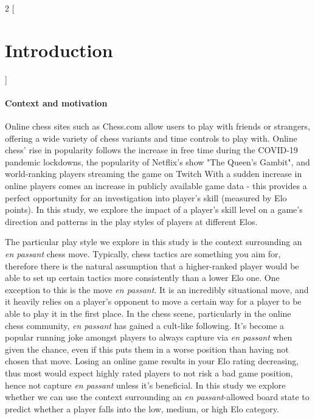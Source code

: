 \documentclass[10pt,a4paper]{article}
\begin{document}
\begin{multicols}{2}
[
\section{Introduction}
]

\paragraph{Context and motivation}

Online chess sites such as Chess.com allow users to play with friends or strangers, offering a wide variety of chess variants and time controls to play with. Online chess' rise in popularity follows the increase in free time during the COVID-19 pandemic lockdowns, the popularity of Netflix's show "The Queen's Gambit", and world-ranking players streaming the game on Twitch \cite{The2020ChessBoom} With a sudden increase in online players comes an increase in publicly available game data - this provides a perfect opportunity for an investigation into player's skill (measured by Elo points). In this study, we explore the impact of a player's skill level on a game's direction and patterns in the play styles of players at different Elos. \newline

The particular play style we explore in this study is the context surrounding an \textit{en passant} chess move. Typically, chess tactics are something you aim for, therefore there is the natural assumption that a higher-ranked player would be able to set up certain tactics more consistently than a lower Elo one. One exception to this is the move \textit{en passant}. It is an incredibly situational move, and it heavily relies on a player's opponent to move a certain way for a player to be able to play it in the first place. In the chess scene, particularly in the online chess community, \textit{en passant} has gained a cult-like following\cite{EnPassant}. It's become a popular running joke amongst players to always capture via \textit{en passant} when given the chance, even if this puts them in a worse position than having not chosen that move. Losing an online game results in your Elo rating decreasing, thus most would expect highly rated players to not risk a bad game position, hence not capture \textit{en passant} unless it's beneficial. In this study we explore whether we can use the context surrounding an \textit{en passant}-allowed board state to predict whether a player falls into the low, medium, or high Elo category. \newline


\end{multicols}
\end{document}

